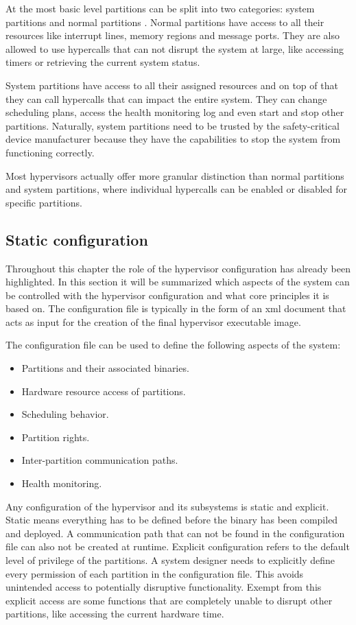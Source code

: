 At the most basic level partitions can be split into two categories: system partitions and normal partitions \cite{xtratum3}. Normal partitions have access to all their resources like interrupt lines, memory regions and message ports. They are also allowed to use hypercalls that can not disrupt the system at large, like accessing timers or retrieving the current system status.

System partitions have access to all their assigned resources and on top of that they can call hypercalls that can impact the entire system. They can change scheduling plans, access the health monitoring log and even start and stop other partitions. Naturally, system partitions need to be trusted by the safety-critical device manufacturer because they have the capabilities to stop the system from functioning correctly.

Most hypervisors actually offer more granular distinction than normal partitions and system partitions, where individual hypercalls can be enabled or disabled for specific partitions.
\subsection{Static configuration}
Throughout this chapter the role of the hypervisor configuration has already been highlighted. In this section it will be summarized which aspects of the system can be controlled with the hypervisor configuration and what core principles it is based on. The configuration file is typically in the form of an \acrshort{xml} document that acts as input for the creation of the final hypervisor executable image.

The configuration file can be used to define the following aspects of the system:
\begin{itemize}
    \item Partitions and their associated binaries.
    \item Hardware resource access of partitions.
    \item Scheduling behavior.
    \item Partition rights.
    \item Inter-partition communication paths.
    \item Health monitoring.
\end{itemize}

Any configuration of the hypervisor and its subsystems is static and explicit. Static means everything has to be defined before the binary has been compiled and deployed. A communication path that can not be found in the configuration file can also not be created at runtime. Explicit configuration refers to the default level of privilege of the partitions. A system designer needs to explicitly define every permission of each partition in the configuration file. This avoids unintended access to potentially disruptive functionality. Exempt from this explicit access are some functions that are completely unable to disrupt other partitions, like accessing the current hardware time.

